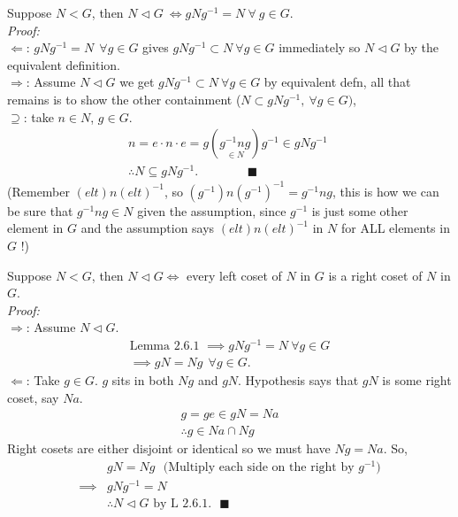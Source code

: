 \begin{lemma}
Suppose $N<G$, then $N\triangleleft G \ \iff gNg^{-1} = N \ \forall \ g \in G$.\\
\textit{Proof:}\\
$\Leftarrow$: $gNg^{-1}= N \ \ \forall g \in G$ gives $gNg^{-1}\subset N \ \forall g \in G$
immediately so $N\triangleleft G$ by the equivalent definition. \\
$\Rightarrow$: Assume $N\triangleleft G$ we get $gNg^{-1}\subset N \ \forall g \in G$ by equivalent
defn, all that remains is to show the other containment
($N \subset gNg^{-1}, \  \forall g \in G)$,\\
$\supseteq$: take $n\in N$, $g\in G$.
\begin{align}
    &n=e\cdot n\cdot e = g(\underset{\in N}{g^{-1}ng})g^{-1} \in gNg^{-1} \ \ \ \ \ \nonumber \\
    &\therefore N \subseteq gNg^{-1}. \ \ \ \ \ \ \ \ \ \ \ \ \ \ \ \ \ \ \blacksquare \nonumber
\end{align}
(Remember $(elt)n(elt)^{-1}$, so $(g^{-1})n(g^{-1})^{-1} = g^{-1}ng$, this is how we can be sure
that $g^{-1}ng \in N$ given the assumption, since $g^{-1}$ is just some other element in $G$ and the
assumption says $(elt)n(elt)^{-1}$ in $N$ for ALL elements in $G$ !)
\end{lemma}

\begin{lemma}
Suppose $N< G$, then $N\triangleleft G \iff $ every left coset of $N$ in $G$ is a right coset of $N$
in $G$. \\
\textit{Proof:}\\
$\Rightarrow$: Assume $N\triangleleft G$.
\begin{align}
    \text{Lemma 2.6.1 }\implies gNg^{-1}= N \ \forall g \in G \nonumber \\
    \implies gN=Ng \ \ \forall g \in G. \nonumber
\end{align}
$\Leftarrow$: Take $g\in G$. $g$ sits in both $Ng$ and $gN$. Hypothesis says that $gN$ is some right
coset, say $Na$.
\begin{align}
    g=ge\in g N = Na \nonumber \\
    \therefore g \in Na\cap Ng \nonumber
\end{align}
Right cosets are either disjoint or identical so we must have $Ng=Na$. So,
\begin{align}
    &gN=Ng \ \ \ \text{(Multiply each side on the right by $g^{-1}$)} \nonumber \\
    \implies &gNg^{-1}=N \nonumber \\
    &\therefore N \triangleleft G \text{ by L 2.6.1}. \ \ \ \blacksquare \nonumber
\end{align}
\end{lemma}

